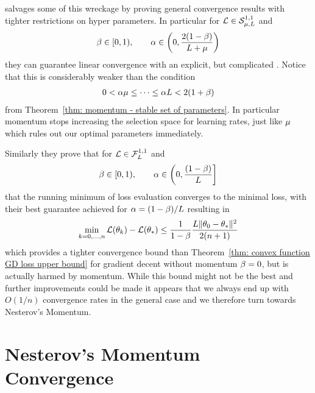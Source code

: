 \textcite{ghadimiGlobalConvergenceHeavyball2015} salvages some of this wreckage
by proving general convergence results with tighter restrictions on hyper
parameters. In particular for \(\mathcal{L}\in\mathcal{S}^{1,1}_{{\mu},{L}}\) and
\begin{align*}
	\beta\in[0,1),
	\qquad \alpha\in \left(0, \frac{2(1-\beta)}{L+\mu}\right)
\end{align*}
they can guarantee linear convergence with an explicit, but complicated
. Notice that this is
considerably weaker than the condition
\begin{align*}
	0<\alpha\mu \le \dots \le \alpha L < 2(1+\beta)
\end{align*}
from Theorem~\ref{thm: momentum - stable set of parameters}. In particular
momentum stops increasing the selection space for learning rates, just like
\(\mu\) which rules out our optimal parameters immediately. 

Similarly they prove that for \(\mathcal{L}\in\mathcal{F}^{1,1}_{L}\) and
\begin{align*}
	\beta\in[0,1),
	\qquad \alpha\in \left(0, \frac{(1-\beta)}{L}\right]
\end{align*}
that the running minimum of loss evaluation converges to the minimal loss,
with their best guarantee achieved for \(\alpha =(1-\beta)/L\)
resulting in
\begin{align*}
	\min_{k=0,\dots,n}\mathcal{L}(\theta_k) -\mathcal{L}(\theta_*)
	\le \frac{1}{1-\beta}\frac{L\|\theta_0-\theta_*\|^2}{2(n+1)}
\end{align*}
which provides a tighter convergence bound than 
Theorem~\ref{thm: convex function GD loss upper bound} for gradient decent 
without momentum \(\beta=0\), but is actually harmed by momentum. While
this bound might not be the best and further improvements could be made
\parencite[see e.g.][]{sunNonErgodicConvergenceAnalysis2019} it appears that we
always end up with \(O(1/n)\) convergence rates in the general case and we
therefore turn towards Nesterov's Momentum.

\section{Nesterov's Momentum Convergence}

